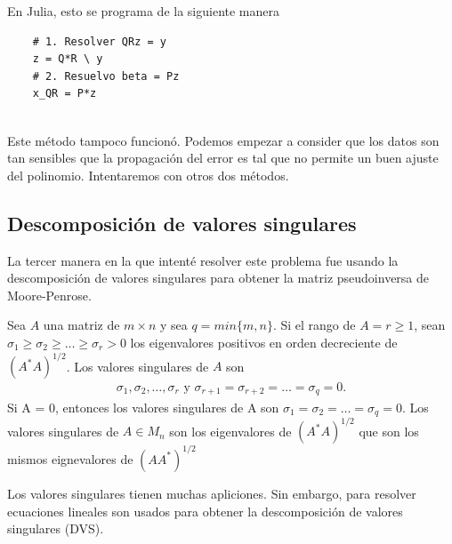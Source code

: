 En Julia, esto se programa de la siguiente manera
\begin{verbatim}
    # 1. Resolver QRz = y
    z = Q*R \ y
    # 2. Resuelvo beta = Pz
    x_QR = P*z
\end{verbatim}
\\

Este método tampoco funcionó. Podemos empezar a consider que los datos son tan sensibles que la propagación del error es tal que no permite un buen ajuste del polinomio. Intentaremos con otros dos métodos.

\subsection{Descomposición de valores singulares}

La tercer manera en la que intenté resolver este problema fue usando la descomposición de valores singulares para obtener la matriz pseudoinversa de Moore-Penrose. 

\begin{definition}
Sea $A$ una matriz de $m \times n$ y sea $q = min \{m, n \}$. Si el rango de $A = r \geq 1$, sean $\sigma_1 \geq \sigma_2 \geq \dots \geq \sigma_r > 0$ los eigenvalores positivos en orden decreciente de $(A^{*}A)^{1/2}$. Los valores singulares de $A$ son
\begin{equation*}
    \begin{aligned}
    \sigma_1, \sigma_2, \dots, \sigma_r \text{ y } \sigma_{r+1} = \sigma_{r+2} = \dots = \sigma_q = 0.
    \end{aligned}
\end{equation*}
Si A = 0, entonces los valores singulares de A son $\sigma_1 = \sigma_2 = \dots = \sigma_q = 0$. 
Los valores singulares de $A \in M_{n}$ son los eigenvalores de $(A^{*}A)^{1/2}$ que son los mismos eignevalores de $(AA^{*})^{1/2}$
\cite{garcia2017second}
\end{definition}

Los valores singulares tienen muchas apliciones. Sin embargo, para resolver ecuaciones lineales son usados para obtener la descomposición de valores singulares (DVS). 


